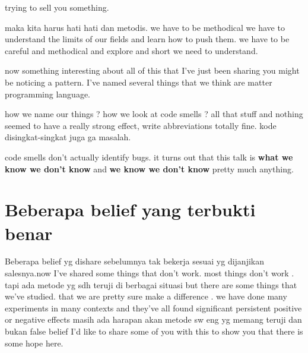 \documentclass[14pt]{extreport}
\begin{document}
 trying to sell you something.
 \par
 maka kita harus hati hati dan metodis.
we have to be methodical we  have to understand the limits of our fields and learn how to push them.
 we have to be careful and methodical and
explore and short we need to understand.
\par
now something interesting about all of this that I've just been sharing you might be noticing a pattern. 
I've named several things that we think are matter programming language. 
\par
how we name our things ? 
how we look at code smells ? 
all that stuff and nothing seemed to have a really strong effect, write abbreviations totally fine. kode disingkat-singkat juga ga masalah.
\par
code smells don't actually identify bugs.
it turns out that this talk is \textbf{what we know we don't know} and \textbf{we know we don't know} pretty much anything.  

\chapter{Beberapa belief yang terbukti benar}
Beberapa belief yg dishare sebelumnya tak bekerja sesuai yg dijanjikan salesnya.now I’ve shared some things that don’t work. most things don’t work .
tapi ada metode yg sdh teruji di berbagai situasi
 but
 there are some things that we’ve studied.
  that we are pretty
 sure make a difference .
 we have done many experiments in
many contexts and they’ve all found significant persistent
 positive or negative effects
masih ada harapan akan metode sw eng yg memang teruji dan bukan false belief
 I’d like to share some of you
with this to show you that there is some hope here.
\end{document}
